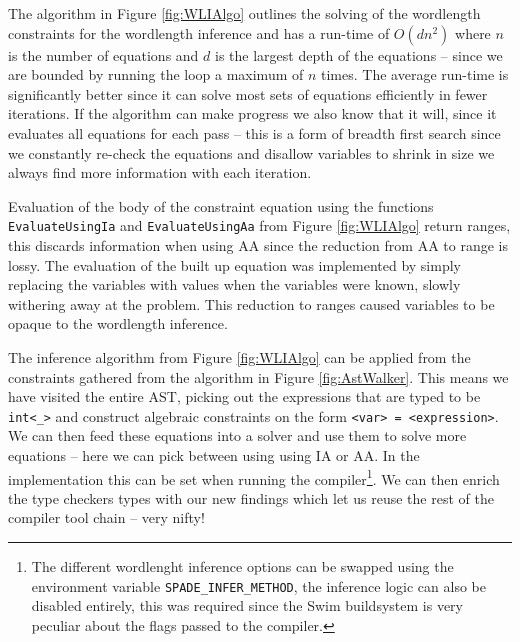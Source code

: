 The algorithm in Figure \ref{fig:WLIAlgo} outlines the solving of the wordlength constraints for the wordlength inference and has a run-time of $O(dn^2)$ where $n$ is the number of equations and $d$ is the largest depth of the equations -- since we are bounded by running the loop a maximum of $n$ times. The average run-time is significantly better since it can solve most sets of equations efficiently in fewer iterations. If the algorithm can make progress we also know that it will, since it evaluates all equations for each pass -- this is a form of breadth first search since we constantly re-check the equations and disallow variables to shrink in size we always find more information with each iteration.

Evaluation of the body of the constraint equation using the functions \verb+EvaluateUsingIa+ and \verb+EvaluateUsingAa+ from Figure \ref{fig:WLIAlgo} return ranges, this discards information when using AA since the reduction from AA to range is lossy. The evaluation of the built up equation was implemented by simply replacing the variables with values when the variables were known, slowly withering away at the problem. This reduction to ranges caused variables to be opaque to the wordlength inference.

The inference algorithm from Figure \ref{fig:WLIAlgo} can be applied from the constraints gathered from the algorithm in Figure \ref{fig:AstWalker}. This means we have visited the entire AST, picking out the expressions that are typed to be \verb+int<_>+ and construct algebraic constraints on the form \verb+<var> = <expression>+. We can then feed these equations into a solver and use them to solve more equations -- here we can pick between using using IA or AA. In the implementation this can be set when running the compiler\cprotect\footnote{The different wordlenght inference options can be swapped using the environment variable \verb+SPADE_INFER_METHOD+, the inference logic can also be disabled entirely, this was required since the Swim buildsystem is very peculiar about the flags passed to the compiler.}. We can then enrich the type checkers types with our new findings which let us reuse the rest of the compiler tool chain -- very nifty!

